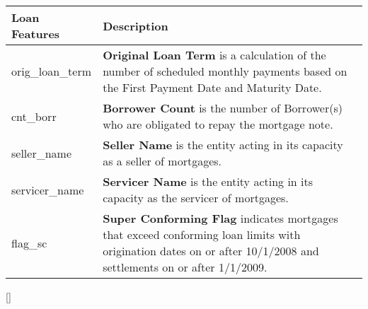 \begin{appendices}
\begin{center}
\begin{tabular}{|p{4cm}|p{10cm}|}
            \hline \textbf{Loan Features} & \textbf{Description} \\ \hline \hline
            orig\_loan\_term & \textbf{Original Loan Term} is a calculation of the number of scheduled monthly payments based on the First Payment Date and Maturity Date. \\ \hline
            cnt\_borr & \textbf{Borrower Count} is the number of Borrower(s) who are obligated to repay the mortgage note. \\ \hline
            seller\_name & \textbf{Seller Name} is the entity acting in its capacity as a seller of mortgages. \\ \hline
            servicer\_name & \textbf{Servicer Name} is the entity acting in its capacity as the servicer of mortgages. \\ \hline
            flag\_sc & \textbf{Super Conforming Flag} indicates mortgages that exceed conforming loan limits with origination dates on or after 10/1/2008 and settlements on or after 1/1/2009. \\ \hline  
        \end{tabular}
    \end{center}
    
    \footnotesize{[]}

    
    
    
    
    
    
    
    
    
    
    
    
    

\end{appendices}
